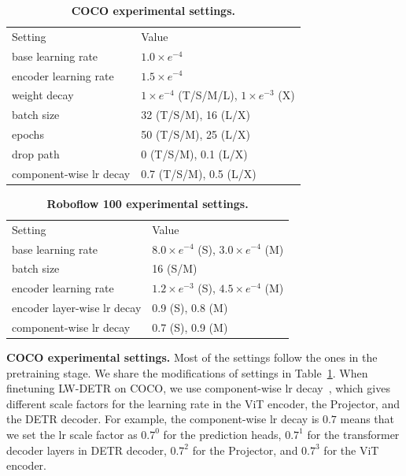 \documentclass[runningheads]{llncs}
\begin{document}
\begin{table}
  \centering
    \setlength{\tabcolsep}{11.8pt}
    \renewcommand{\arraystretch}{1.41}
    \tiny
  \caption{\textbf{COCO experimental settings.}}
  \vspace{-3mm}
  \begin{tabular}{l|l}
    Setting  & Value\\
    \shline
    base learning rate & $1.0\times e^{-4}$ \\
    encoder learning rate & $1.5\times e^{-4}$ \\
    weight decay & $1\times e^{-4}$ (T/S/M/L), $1\times e^{-3}$ (X) \\
    batch size & 32 (T/S/M), 16 (L/X) \\
    epochs & 50 (T/S/M), 25 (L/X) \\
    drop path & 0 (T/S/M), 0.1 (L/X) \\
    component-wise lr decay & 0.7 (T/S/M), 0.5 (L/X)
  \end{tabular}
  \label{tab:cocosettings}
  \vspace{-3mm}
\end{table}
\begin{table}
  \centering
    \setlength{\tabcolsep}{11.8pt}
    \renewcommand{\arraystretch}{1.41}
    \tiny
  \caption{\textbf{Roboflow 100 experimental settings.}}
  \vspace{-3mm}
  \begin{tabular}{l|l}
    Setting  & Value\\
    \shline
    base learning rate & $8.0\times e^{-4}$ (S), $3.0\times e^{-4}$ (M) \\
    batch size & 16 (S/M) \\
    encoder learning rate & $1.2\times e^{-3}$ (S), $4.5\times e^{-4}$ (M) \\
    encoder layer-wise lr decay & 0.9 (S), 0.8 (M) \\
    component-wise lr decay & 0.7 (S), 0.9 (M)
  \end{tabular}
  \label{tab:rf100settings}
  \vspace{-5mm}
\end{table}
\vspace{1mm}
\noindent\textbf{COCO experimental settings.} Most of the settings follow the ones in the pretraining stage. We share the modifications of settings in Table~\ref{tab:cocosettings}. When finetuning LW-DETR on COCO, we use component-wise lr decay~\cite{chen2022group}, which gives different scale factors for the learning rate in the ViT encoder, the Projector, and the DETR decoder. For example, the component-wise lr decay is $0.7$ means that we set the lr scale factor as $0.7^0$ for the prediction heads, $0.7^1$ for the transformer decoder layers in DETR decoder, $0.7^2$ for the Projector, and $0.7^3$ for the ViT encoder.
\end{document}
